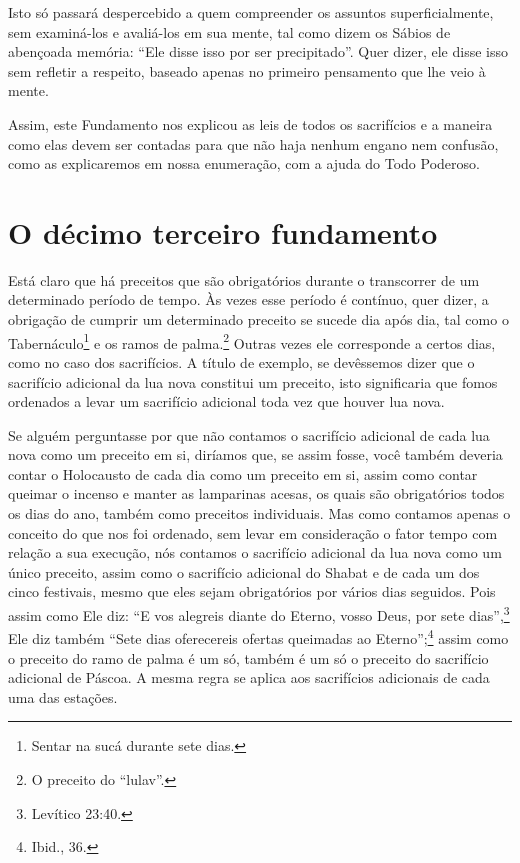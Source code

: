 Isto só passará despercebido a quem compreender os assuntos
superficialmente, sem examiná-los e avaliá-los em sua mente, tal como
dizem os Sábios de abençoada memória: ``Ele disse isso por ser
precipitado''. Quer dizer, ele disse isso sem refletir a respeito,
baseado apenas no primeiro pensamento que lhe veio à mente.

Assim, este Fundamento nos explicou as leis de todos os sacrifícios e a
maneira como elas devem ser contadas para que não haja nenhum engano nem
confusão, como as explicaremos em nossa enumeração, com a ajuda do Todo
Poderoso.

\chapter*{O décimo terceiro fundamento}

Está claro que há preceitos que são obrigatórios durante o transcorrer
de um determinado período de tempo. Às vezes esse período é contínuo,
quer dizer, a obrigação de cumprir um determinado preceito se sucede dia
após dia, tal como o Tabernáculo\footnote{Sentar na sucá\starr{} durante sete dias.} e os ramos de
palma.\footnote{O preceito do ``lulav''.} Outras vezes ele corresponde a certos dias,
como no caso dos sacrifícios. A título de exemplo, se devêssemos dizer
que o sacrifício adicional da lua nova constitui um preceito, isto
significaria que fomos ordenados a levar um sacrifício adicional toda
vez que houver lua nova.

Se alguém perguntasse por que não contamos o sacrifício adicional de
cada lua nova como um preceito em si, diríamos que, se assim fosse, você
também deveria contar o Holocausto de cada dia como um preceito em si,
assim como contar queimar o incenso e manter as lamparinas acesas, os
quais são obrigatórios todos os dias do ano, também como preceitos
individuais. Mas como contamos apenas o conceito do que nos foi
ordenado, sem levar em consideração o fator tempo com relação a sua
execução, nós contamos o sacrifício adicional da lua nova como um único
preceito, assim como o sacrifício adicional do Shabat e de cada um dos
cinco festivais, mesmo que eles sejam obrigatórios por vários dias
seguidos. Pois assim como Ele diz: ``E vos alegreis diante do Eterno,
vosso Deus, por sete dias'',\footnote{Levítico 23:40.} Ele diz também ``Sete dias
oferecereis ofertas queimadas ao Eterno'';\footnote{Ibid., 36.} assim como o
preceito do ramo de palma é um só, também é um só o preceito do
sacrifício adicional de Páscoa. A mesma regra se aplica aos sacrifícios
adicionais de cada uma das estações.

